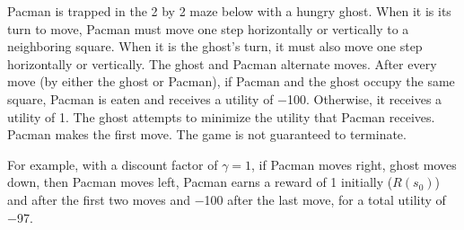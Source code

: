 \documentclass[11pt, a4paper]{exam}
\begin{document}
\begin{exercises}


Pacman is trapped in the 2 by 2 maze below with a hungry ghost. When it is its turn to move, Pacman must move one step horizontally or vertically to a neighboring square. When it is the ghost's turn, it must also move one step horizontally or vertically. The ghost and Pacman alternate moves. After every move (by either the ghost or Pacman), if Pacman and the ghost occupy the same square, Pacman is eaten and receives a utility of \num{-100}. Otherwise, it receives a utility of \num{1}. The ghost attempts to minimize the utility that Pacman receives. Pacman makes the first move. The game is not guaranteed to terminate.

\begin{center}
\end{center}

For example, with a discount factor of $\gamma = 1$, if Pacman moves right, ghost moves down, then Pacman moves left, Pacman earns a reward of 1 initially ($R(s_0)$) and after the first two moves and \num{-100} after the last move, for a total utility of \num{-97}.


\end{exercises}
\end{document}
